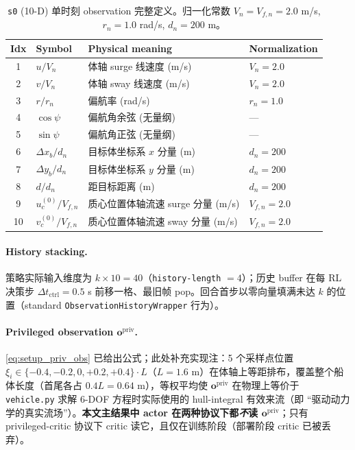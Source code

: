 \begin{table}[h]
\centering
\small
\caption{\texttt{s0} (10-D) 单时刻 observation 完整定义。归一化常数 $V_n = V_{f, n} = 2.0$ m/s, $r_n = 1.0$ rad/s, $d_n = 200$ m。}
\label{tab:obs_channels_full}
\begin{tabular}{clll}
\toprule
\textbf{Idx} & \textbf{Symbol} & \textbf{Physical meaning} & \textbf{Normalization} \\
\midrule
1 & $u / V_n$ & 体轴 surge 线速度 (m/s) & $V_n = 2.0$ \\
2 & $v / V_n$ & 体轴 sway 线速度 (m/s) & $V_n = 2.0$ \\
3 & $r / r_n$ & 偏航率 (rad/s) & $r_n = 1.0$ \\
4 & $\cos \psi$ & 偏航角余弦 (无量纲) & — \\
5 & $\sin \psi$ & 偏航角正弦 (无量纲) & — \\
6 & $\Delta x_b / d_n$ & 目标体坐标系 $x$ 分量 (m) & $d_n = 200$ \\
7 & $\Delta y_b / d_n$ & 目标体坐标系 $y$ 分量 (m) & $d_n = 200$ \\
8 & $d / d_n$ & 距目标距离 (m) & $d_n = 200$ \\
9 & $u_c^{(0)} / V_{f, n}$ & 质心位置体轴流速 surge 分量 (m/s) & $V_{f, n} = 2.0$ \\
10 & $v_c^{(0)} / V_{f, n}$ & 质心位置体轴流速 sway 分量 (m/s) & $V_{f, n} = 2.0$ \\
\bottomrule
\end{tabular}
\end{table}

\paragraph{History stacking.}\quad
策略实际输入维度为 $k \times 10 = 40$（\texttt{history-length} $= 4$）；历史 buffer 在每 RL 决策步 $\Delta t_{\text{ctrl}} = 0.5$ s 前移一格、最旧帧 pop。回合首步以零向量填满未达 $k$ 的位置（standard \texttt{ObservationHistoryWrapper} 行为）。

\paragraph{Privileged observation $\mathbf{o}^{\text{priv}}$.}\quad
\eqref{eq:setup_priv_obs} 已给出公式；此处补充实现注：5 个采样点位置 $\xi_i \in \{-0.4, -0.2, 0, +0.2, +0.4\} \cdot L$（$L = 1.6$ m）在体轴上等距排布，覆盖整个船体长度（首尾各占 $0.4 L = 0.64$ m），等权平均使 $\mathbf{o}^{\text{priv}}$ 在物理上等价于 \texttt{vehicle.py} 求解 6-DOF 方程时实际使用的 hull-integral 有效来流（即 ``驱动动力学的真实流场''）。\textbf{本文主结果中 actor 在两种协议下都\emph{不}读 $\mathbf{o}^{\text{priv}}$}；只有 privileged-critic 协议下 critic 读它，且仅在训练阶段（部署阶段 critic 已被丢弃）。
